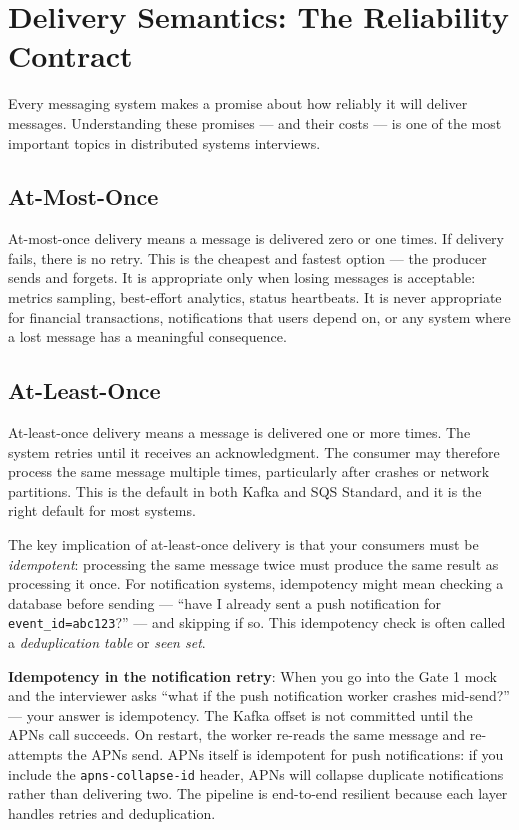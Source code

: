 \documentclass[11pt,a4paper]{article}
\begin{document}
\section{Delivery Semantics: The Reliability Contract}

Every messaging system makes a promise about how reliably it will deliver messages. Understanding these promises --- and their costs --- is one of the most important topics in distributed systems interviews.

\subsection{At-Most-Once}

At-most-once delivery means a message is delivered zero or one times. If delivery fails, there is no retry. This is the cheapest and fastest option --- the producer sends and forgets. It is appropriate only when losing messages is acceptable: metrics sampling, best-effort analytics, status heartbeats. It is never appropriate for financial transactions, notifications that users depend on, or any system where a lost message has a meaningful consequence.

\subsection{At-Least-Once}

At-least-once delivery means a message is delivered one or more times. The system retries until it receives an acknowledgment. The consumer may therefore process the same message multiple times, particularly after crashes or network partitions. This is the default in both Kafka and SQS Standard, and it is the right default for most systems.

The key implication of at-least-once delivery is that your consumers must be \textit{idempotent}: processing the same message twice must produce the same result as processing it once. For notification systems, idempotency might mean checking a database before sending --- ``have I already sent a push notification for \texttt{event\_id=abc123}?'' --- and skipping if so. This idempotency check is often called a \textit{deduplication table} or \textit{seen set}.

\begin{thinkbox}
\textbf{Idempotency in the notification retry}: When you go into the Gate 1 mock and the interviewer asks ``what if the push notification worker crashes mid-send?'' --- your answer is idempotency. The Kafka offset is not committed until the APNs call succeeds. On restart, the worker re-reads the same message and re-attempts the APNs send. APNs itself is idempotent for push notifications: if you include the \texttt{apns-collapse-id} header, APNs will collapse duplicate notifications rather than delivering two. The pipeline is end-to-end resilient because each layer handles retries and deduplication.
\end{thinkbox}
\end{document}
